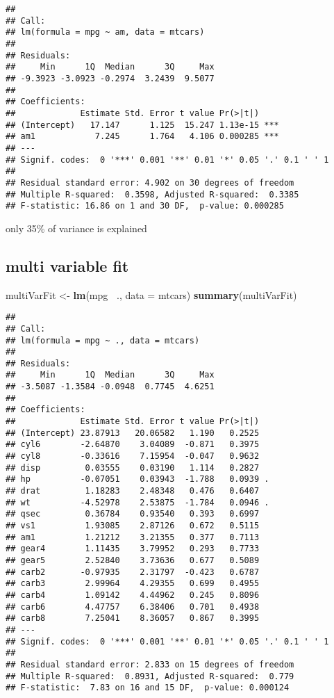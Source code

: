 \documentclass[
]{article}
\newenvironment{Shaded}{\begin{snugshade}}{\end{snugshade}}
\newcommand{\DataTypeTok}[1]{\textcolor[rgb]{0.13,0.29,0.53}{#1}}
\newcommand{\KeywordTok}[1]{\textcolor[rgb]{0.13,0.29,0.53}{\textbf{#1}}}
\newcommand{\NormalTok}[1]{#1}
\newcommand{\OperatorTok}[1]{\textcolor[rgb]{0.81,0.36,0.00}{\textbf{#1}}}
\newcommand{\StringTok}[1]{\textcolor[rgb]{0.31,0.60,0.02}{#1}}
\begin{document}
\begin{verbatim}
## 
## Call:
## lm(formula = mpg ~ am, data = mtcars)
## 
## Residuals:
##     Min      1Q  Median      3Q     Max 
## -9.3923 -3.0923 -0.2974  3.2439  9.5077 
## 
## Coefficients:
##             Estimate Std. Error t value Pr(>|t|)    
## (Intercept)   17.147      1.125  15.247 1.13e-15 ***
## am1            7.245      1.764   4.106 0.000285 ***
## ---
## Signif. codes:  0 '***' 0.001 '**' 0.01 '*' 0.05 '.' 0.1 ' ' 1
## 
## Residual standard error: 4.902 on 30 degrees of freedom
## Multiple R-squared:  0.3598, Adjusted R-squared:  0.3385 
## F-statistic: 16.86 on 1 and 30 DF,  p-value: 0.000285
\end{verbatim}

only 35\% of variance is explained

\hypertarget{multi-variable-fit}{%
\subsection{multi variable fit}\label{multi-variable-fit}}

\begin{Shaded}
\begin{Highlighting}[]
\NormalTok{multiVarFit <-}\StringTok{ }\KeywordTok{lm}\NormalTok{(mpg }\OperatorTok{~}\NormalTok{., }\DataTypeTok{data =}\NormalTok{ mtcars)}
\KeywordTok{summary}\NormalTok{(multiVarFit)}
\end{Highlighting}
\end{Shaded}

\begin{verbatim}
## 
## Call:
## lm(formula = mpg ~ ., data = mtcars)
## 
## Residuals:
##     Min      1Q  Median      3Q     Max 
## -3.5087 -1.3584 -0.0948  0.7745  4.6251 
## 
## Coefficients:
##             Estimate Std. Error t value Pr(>|t|)  
## (Intercept) 23.87913   20.06582   1.190   0.2525  
## cyl6        -2.64870    3.04089  -0.871   0.3975  
## cyl8        -0.33616    7.15954  -0.047   0.9632  
## disp         0.03555    0.03190   1.114   0.2827  
## hp          -0.07051    0.03943  -1.788   0.0939 .
## drat         1.18283    2.48348   0.476   0.6407  
## wt          -4.52978    2.53875  -1.784   0.0946 .
## qsec         0.36784    0.93540   0.393   0.6997  
## vs1          1.93085    2.87126   0.672   0.5115  
## am1          1.21212    3.21355   0.377   0.7113  
## gear4        1.11435    3.79952   0.293   0.7733  
## gear5        2.52840    3.73636   0.677   0.5089  
## carb2       -0.97935    2.31797  -0.423   0.6787  
## carb3        2.99964    4.29355   0.699   0.4955  
## carb4        1.09142    4.44962   0.245   0.8096  
## carb6        4.47757    6.38406   0.701   0.4938  
## carb8        7.25041    8.36057   0.867   0.3995  
## ---
## Signif. codes:  0 '***' 0.001 '**' 0.01 '*' 0.05 '.' 0.1 ' ' 1
## 
## Residual standard error: 2.833 on 15 degrees of freedom
## Multiple R-squared:  0.8931, Adjusted R-squared:  0.779 
## F-statistic:  7.83 on 16 and 15 DF,  p-value: 0.000124
\end{verbatim}
\end{document}
